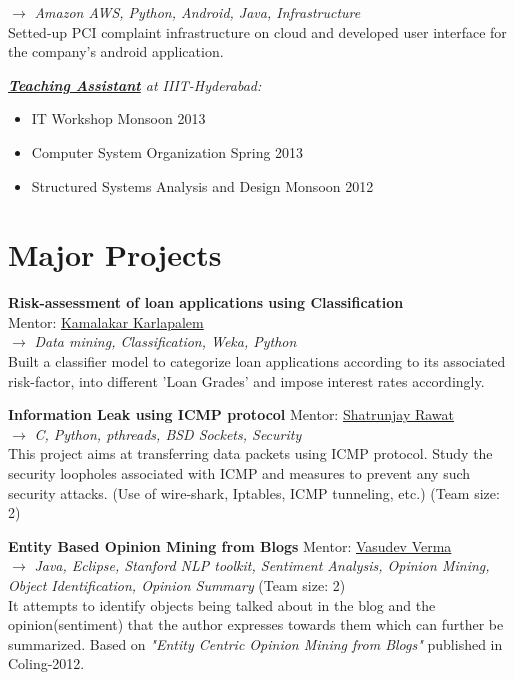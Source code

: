 \documentclass[margin]{res}
\begin{document}
\begin{resume}
\begin{itemize}
\hypersetup{urlcolor=blue}
$\rightarrow$ {\it Amazon AWS, Python, Android, Java, Infrastructure } \\
 Setted-up PCI complaint infrastructure on cloud and developed user interface for the company's android application.   
\end{itemize} 

{\sl \underline{\bf Teaching Assistant} at IIIT-Hyderabad: } 
\begin{itemize}
\item IT Workshop  \hfill{Monsoon 2013}
\item Computer System Organization \hfill{Spring 2013}
\item Structured Systems Analysis and Design \hfill{Monsoon 2012}
\end{itemize}



\section{Major Projects}
{\bf Risk-assessment of loan applications using Classification } \\ \hfill{Mentor: \href{http://iiit.ac.in/people/faculty/kamal}{Kamalakar Karlapalem}}  \\
$\rightarrow$ {\it Data mining, Classification, Weka, Python  } \\
Built a classifier model to categorize loan applications according to its associated risk-factor, into different 'Loan Grades' and impose interest rates accordingly.


{\bf Information Leak using ICMP protocol} \hfill{Mentor: \href{http://iiit.ac.in/people/faculty/shatrunjay.rawat}{Shatrunjay Rawat}}  \\
$\rightarrow$ {\it C, Python, pthreads, BSD Sockets, Security } \\
This project aims at transferring data packets using ICMP protocol. Study the security loopholes associated with ICMP and measures to prevent any such security attacks. (Use of wire-shark, Iptables, ICMP tunneling, etc.)  \hfill{(Team size: 2)}

{\bf Entity Based Opinion Mining from Blogs} \hfill{Mentor: \href{http://faculty.iiit.ac.in/~vv/Home.html}{Vasudev Verma}} \\
$\rightarrow$ {\it Java, Eclipse, Stanford NLP toolkit, Sentiment Analysis, Opinion Mining, Object Identification, Opinion Summary
} \hfill{(Team size: 2)} \\
It attempts to identify objects being
talked about in the blog and the opinion(sentiment) that the author expresses
towards them which can further be summarized. 
Based on {\it "Entity Centric Opinion Mining from Blogs"} published in Coling-2012. 


\end{resume}
\end{document}
